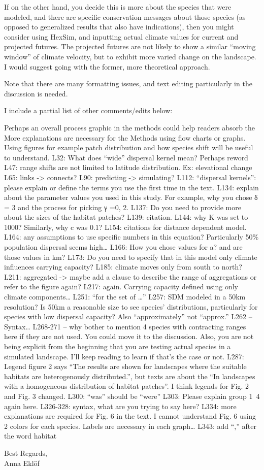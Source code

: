 \documentclass[12pt,pdftex]{article}
\begin{document}
If on the other hand, you decide this is more about the species that were modeled, and there are specific conservation messages about those species (as opposed to generalized results that also have indications), then you might consider using HexSim, and inputting actual climate values for current and projected futures. The projected futures are not likely to show a similar “moving window” of climate velocity, but to exhibit more varied change on the landscape. 
I would suggest going with the former, more theoretical approach.

Note that there are many formatting issues, and text editing particularly in the discussion is needed. 

I include a partial list of other comments/edits below:




Perhaps an overall process graphic in the methods could help readers absorb the More explanations are necessary for the Methods using flow charts or graphs.
Using figures for example patch distribution and how species shift will be useful to understand.
L32: What does “wide” dispersal  kernel mean? Perhaps reword
L47: range shifts are not limited to latitude distribution. Ex: elevational change
L65: links -> connects?
L90: predicting -> simulating?
L112: “dispersal kernels”: please explain or define the terms you use the first time in the text.
L134: explain about the parameter values you used in this study. For example, why you chose δ = 3 and the process for picking γ =0, 2. 
L137: Do you need to provide more about the sizes of the habitat patches?
L139: citation.
L144: why K was set to 1000? Similarly, why c was 0.1?
L154: citations for distance dependent model.
L164: any assumptions to use specific numbers in this equation? Particularly 50\% population dispersal seems high…
L166: How you chose values for a? and are those values in km?
L173: Do you need to specify that in this model only climate influences carrying capacity?
L185: climate moves only from south to north?  
L211: aggregated -> maybe add a clause to describe the range of aggregations or refer to the figure again?
L217: again. Carrying capacity defined using only climate components… 
L251: “for the set of …”
L257: SDM modeled in a 50km resolution? Is 50km a reasonable size to see species’ distributions, particularly for species with low dispersal capacity? Also “approximately” not “approx.”
L262 – Syntax…
L268-271 – why bother to mention 4 species with contracting ranges here if they are not used. You could move it to the discussion. Also, you are not being explicit from the beginning that you are testing actual species in a simulated landscape. I’ll keep reading to learn if that’s the case or not.
L287: Legend figure 2 says “The results are shown for landscapes where the suitable habitats are heterogenously distributed.”, but texts are about the “In landscapes with a homogeneous distribution of habitat patches”. I think legends for Fig. 2 and Fig. 3 changed.
L300: “was” should be “were”
L303: Please explain group 1~4 again here.
L326-328: syntax, what are you trying to say here?
L334: more explanations are required for Fig. 6 in the text. I cannot understand Fig. 6 using 2 colors for each species. Labels are necessary in each graph…
L343: add “,” after the word habitat


\begin{flushright}
  Best Regards,\\
  Anna Ekl\"of
\end{flushright}
\end{document}
